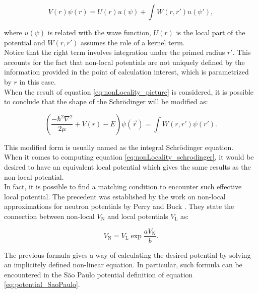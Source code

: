 \documentclass[openany]{book}
\begin{document}
\begin{equation} \label{eq:nonLocality_picture}
	V(r) \psi(r) = U(r) u(\psi) + \int W(r, r') u(\psi'),
\end{equation}

where $u(\psi)$ is related with the wave function, $U(r)$ is the local part of the potential and $W(r, r')$ assumes the role of a kernel term. \\

Notice that the right term involves integration under the primed radius $r'$. This accounts for the fact that non-local potentials are not uniquely defined by the information provided in the point of calculation interest, which is parametrized by $r$ in this case. \\

When the result of equation \ref{eq:nonLocality_picture} is considered, it is possible to conclude that the shape of the Schrödinger will be modified as:

\begin{equation} \label{eq:nonLocality_schrodinger}
	\left(\frac{-\hbar^2 \nabla^2}{2\mu} + V(r)  - E  \right) \psi(\vec r) =   \int W(r, r') \psi(r').
\end{equation}

This modified form is usually named as the integral Schrödinger equation. \\

When it comes to computing equation \ref{eq:nonLocality_schrodinger}, it would be desired to have an equivalent local potential which gives the same results as the non-local potential. \\

In fact, it is possible to find a matching condition to encounter such effective local potential. The precedent was established by the work on non-local approximations for neutron potentials by Perry and Buck \cite{perey_buck_1962}. They state the connection between non-local $V_{\mathrm{N}}$ and local potentials $V_{\mathrm{L}}$ as:

\begin{equation}\label{eq:nonLocality_connection}
	V_{\mathrm{N}} = V_{\mathrm{L}} \exp{\frac{a V_{\mathrm{N}}}{b}}.
\end{equation}

The previous formula gives a way of calculating the desired potential by solving an implicitely defined non-linear equation. In particular, such formula can be encountered in the São Paulo potential definition of equation \ref{eq:potential_SaoPaulo}. \\
\end{document}
